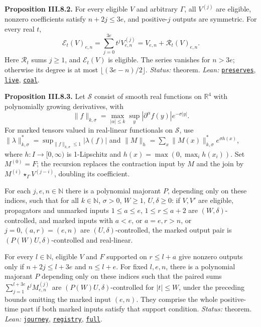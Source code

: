 \documentclass[
  letterpaper,
  11pt]{article}
\begin{document}
\textbf{Proposition III.8.2.} For every eligible \(V\) and arbitrary
\(\Gamma\), all \(V^{(j)}\) are eligible, nonzero coefficients satisfy
\(n+2j\le3e\), and positive-\(j\) outputs are symmetric. For every real
\(t\),
\[\mathcal E_t(V)_{e,n}=\sum_{j=0}^{3e}t^jV^{(j)}_{e,n}=V_{e,n}+\mathcal R_t(V)_{e,n}.\]
Here \(\mathcal R_t\) sums \(j\ge1\), and \(\mathcal E_t(V)\) is
eligible. The series vanishes for \(n>3e\); otherwise its degree is at
most \(\lfloor(3e-n)/2\rfloor\). \emph{Status:} theorem. \emph{Lean:}
\href{https://github.com/yang-mills-group/OpenAI-YM-20261028/blob/3456e5e75cf8d4cd558955a5c7638fba2d68f464/YM/RG08/Steam/Valves.lean\#L50-L64}{\texttt{preserves}},
\href{https://github.com/yang-mills-group/OpenAI-YM-20261028/blob/3456e5e75cf8d4cd558955a5c7638fba2d68f464/YM/RG08/Steam/Valves.lean\#L66-L70}{\texttt{live}},
\href{https://github.com/yang-mills-group/OpenAI-YM-20261028/blob/3456e5e75cf8d4cd558955a5c7638fba2d68f464/YM/RG08/Steam/Gears.lean\#L65-L75}{\texttt{coal}}.

\textbf{Proposition III.8.3.} Let \(\mathcal S\) consist of smooth real
functions on \(\mathbb R^4\) with polynomially growing derivatives, with
\[\|f\|_{k,\sigma}=\max_{|\alpha|\le k}\sup_y|\partial^\alpha f(y)|e^{-\sigma|y|}.\]
For marked tensors valued in real-linear functionals on \(\mathcal S\),
use \(\|\lambda\|^*_{k,\sigma}=\sup_{\|f\|_{k,\sigma}\le1}|\lambda(f)|\)
and \(\|M\|_h=\sum_x\|M(x)\|^*_{k,\sigma}e^{\sigma h(x)}\), where
\(h:I\to[0,\infty)\) is 1-Lipschitz and \(h(x)=\max(0,\max_i h(x_i))\).
Set \(M^{(0)}=F\); the recursion replaces the contraction input by \(M\)
and the join by \(M^{(i)}\star_\Gamma V^{(j-i)}\), doubling its
coefficient.

For each \(j,e,n\in\mathbb N\) there is a polynomial majorant \(P\),
depending only on these indices, such that for all \(k\in\mathbb N\),
\(\sigma>0\), \(W\ge1\), \(U,\delta\ge0\): if \(V,V'\) are eligible,
propagators and unmarked inputs \(1\le a\le e\), \(1\le r\le a+2\) are
\((W,\delta)\)-controlled, and marked inputs with \(a<e\), or
\(a=e,r>n\), or \(j=0,(a,r)=(e,n)\) are \((U,\delta)\)-controlled, the
marked output pair is \((P(W)U,\delta)\)-controlled and real-linear.

For every \(l\in\mathbb N\), eligible \(V\) and \(F\) supported on
\(r\le l+a\) give nonzero outputs only if \(n+2j\le l+3e\) and
\(n\le l+e\). For fixed \(l,e,n\), there is a polynomial majorant \(P\)
depending only on these indices such that the paired sums
\(\sum_{j=1}^{l+3e}t^jM^{(j)}_{e,n}\) are \((P(W)U,\delta)\)-controlled
for \(|t|\le W\), under the preceding bounds omitting the marked input
\((e,n)\). They comprise the whole positive-time part if both marked
inputs satisfy that support condition. \emph{Status:} theorem.
\emph{Lean:}
\href{https://github.com/yang-mills-group/OpenAI-YM-20261028/blob/3456e5e75cf8d4cd558955a5c7638fba2d68f464/YM/RG08/Skiff/Spoke.lean\#L92-L127}{\texttt{journey}},
\href{https://github.com/yang-mills-group/OpenAI-YM-20261028/blob/3456e5e75cf8d4cd558955a5c7638fba2d68f464/YM/RG08/Skiff/Shed.lean\#L25-L36}{\texttt{registry}},
\href{https://github.com/yang-mills-group/OpenAI-YM-20261028/blob/3456e5e75cf8d4cd558955a5c7638fba2d68f464/YM/RG08/Skiff/Spoke.lean\#L61-L68}{\texttt{full}}.
\end{document}
